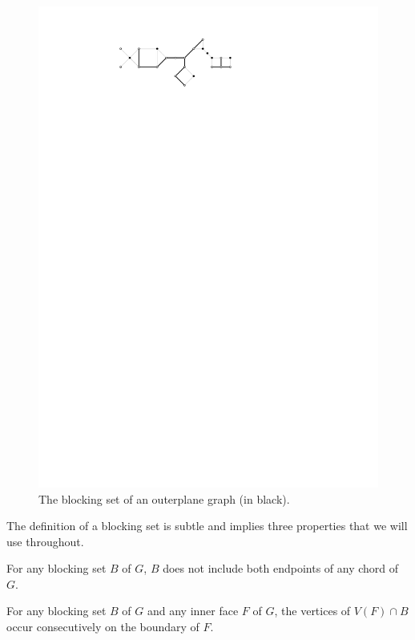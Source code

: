 \documentclass{patmorin}
\begin{document}
\begin{figure}
  \begin{center}
     \includegraphics{figs/blocking-set-1}
  \end{center}
  \caption{The blocking set of an outerplane graph (in black).}
\end{figure}

The definition of a blocking set is subtle and implies three properties
that we will use throughout.   

\begin{obs}
   For any blocking set $B$ of $G$, $B$ does not include both endpoints
   of any chord of $G$.
\end{obs}

\begin{obs}
   For any blocking set $B$ of $G$ and any inner face $F$ of $G$, the
   vertices of $V(F)\cap B$ occur consecutively on the boundary of $F$.
\end{obs}
\end{document}
